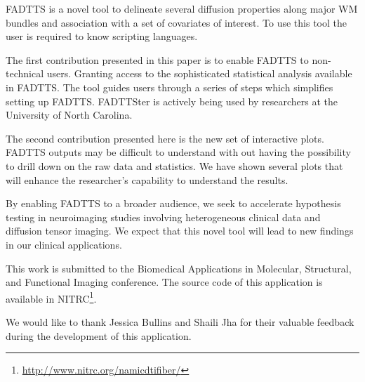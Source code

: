 \documentclass[]{spie}  %
\begin{document}
FADTTS is a novel tool to delineate several diffusion properties along major WM bundles and association with 
a set of covariates of interest. To use this tool the user is required to know scripting languages. 

The first contribution presented in this paper is to enable FADTTS to non-technical users. 
Granting access to the sophisticated statistical analysis available in FADTTS.
The tool guides users through 
a series of steps which simplifies setting up FADTTS. 
FADTTSter is actively being used by researchers at the University of North Carolina. 

The second contribution presented here is the new set of interactive plots. 
FADTTS outputs may be difficult to understand with out having the possibility to drill down 
on the raw data and statistics. We have shown several plots that 
will enhance the researcher's capability to understand the results.

By enabling FADTTS to a broader audience, we seek to accelerate hypothesis testing in neuroimaging studies involving
heterogeneous clinical data and diffusion tensor imaging.
We expect that this novel tool will lead to new findings in our clinical applications.

This work is submitted to the Biomedical Applications in Molecular, Structural, and Functional Imaging conference. 
The source code of this application is available in NITRC\footnote{\url{http://www.nitrc.org/namicdtifiber/}}.

\acknowledgments
\label{sec:acknowledgments}

We would like to thank Jessica Bullins and Shaili Jha for their valuable feedback during the development 
of this application. 


\end{document}
